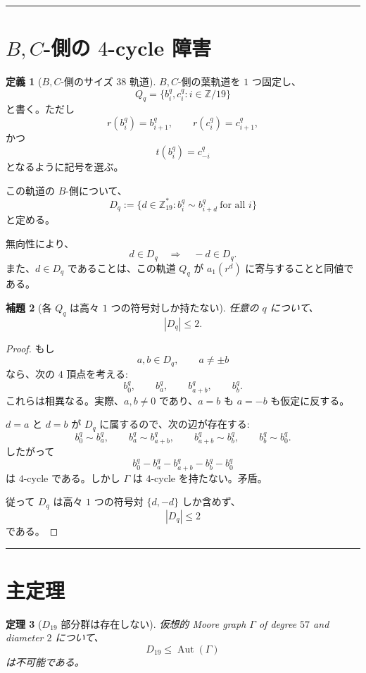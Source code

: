\documentclass[11pt,a4paper]{article}
\theoremstyle{plain}
\newtheorem{theorem}{定理}[section]
\newtheorem{lemma}[theorem]{補題}
\theoremstyle{definition}
\newtheorem{definition}[theorem]{定義}
\theoremstyle{remark}
\DeclareMathOperator{\Aut}{Aut}
\begin{document}
\bigskip
\hrule
\bigskip

\section{$B,C$-側の $4$-cycle 障害}

\begin{definition}[$B,C$-側のサイズ $38$ 軌道]\label{def:BCorbit}
$B,C$-側の葉軌道を $1$ つ固定し、
\[
Q_q = \{b_i^q, c_i^q : i \in \mathbb{Z}/19\}
\]
と書く。ただし
\[
r(b_i^q) = b_{i+1}^q, \qquad r(c_i^q) = c_{i+1}^q,
\]
かつ
\[
t(b_i^q) = c_{-i}^q
\]
となるように記号を選ぶ。

この軌道の $B$-側について、
\[
D_q := \{d \in \mathbb{Z}_{19}^{\ast} : b_i^q \sim b_{i+d}^q\ \text{for all } i\}
\]
と定める。

無向性により、
\[
d \in D_q \quad\Longrightarrow\quad -d \in D_q.
\]
また、$d \in D_q$ であることは、この軌道 $Q_q$ が $a_1(r^d)$ に寄与することと同値である。
\end{definition}

\begin{lemma}[各 $Q_q$ は高々 $1$ つの符号対しか持たない]\label{lem:Dqbound}
任意の $q$ について、
\[
|D_q| \le 2.
\]
\end{lemma}

\begin{proof}
もし
\[
a, b \in D_q, \qquad a \neq \pm b
\]
なら、次の $4$ 頂点を考える:
\[
b_0^q, \qquad b_a^q, \qquad b_{a+b}^q, \qquad b_b^q.
\]
これらは相異なる。実際、$a, b \neq 0$ であり、$a = b$ も $a = -b$ も仮定に反する。

$d = a$ と $d = b$ が $D_q$ に属するので、次の辺が存在する:
\[
b_0^q \sim b_a^q, \qquad b_a^q \sim b_{a+b}^q, \qquad b_{a+b}^q \sim b_b^q, \qquad b_b^q \sim b_0^q.
\]
したがって
\[
b_0^q - b_a^q - b_{a+b}^q - b_b^q - b_0^q
\]
は $4$-cycle である。しかし $\Gamma$ は $4$-cycle を持たない。矛盾。

従って $D_q$ は高々 $1$ つの符号対 $\{d, -d\}$ しか含めず、
\[
|D_q| \le 2
\]
である。
\end{proof}

\bigskip
\hrule
\bigskip

\section{主定理}

\begin{theorem}[$D_{19}$ 部分群は存在しない]\label{thm:main}
仮想的 Moore graph $\Gamma$ of degree $57$ and diameter $2$ について、
\[
D_{19} \le \Aut(\Gamma)
\]
は不可能である。
\end{theorem}
\end{document}
